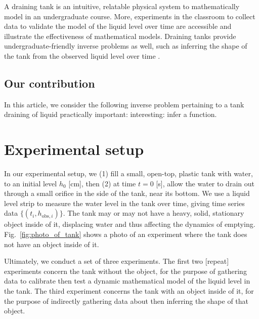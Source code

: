 \documentclass[openacc]{rsproca_new}%
\begin{document}

A draining tank is an intuitive, relatable physical system to mathematically model in an undergraduate course. 
More, experiments in the classroom to collect data to validate the model of the liquid level over time are accessible and illustrate the effectiveness of mathematical models.
\cite{farmer1992physical,driver1998torricelli,brady2009siphons,rother2024modelling,paldy1963apparatus,ivanov2014testing,williams2021vessel,pavesi2019investigating,planinvsivc2011holes,saleta2005experimental,lopac2015water,powell2012carrying}
Draining tanks provide undergraduate-friendly inverse problems \cite{groetsch1993inverse,neto2012introduction,tarantola2005inverse} as well, such as inferring the shape of the tank from the observed liquid level over time \cite{groetsch1993inverse,groetsch1999inverse}. 

\subsection{Our contribution}
In this article, we consider the following inverse problem pertaining to a tank draining of liquid
practically important:
interesting: infer a function. 


\section{Experimental setup} \label{sec:expt}
In our experimental setup, we (1) fill a small, open-top, plastic tank with water, to an initial level $h_0$ [cm], then (2) at time $t=0$ [s], allow the water to drain out through a small orifice in the side of the tank, near its bottom. 
We use a liquid level strip to measure the water level in the tank over time, giving time series data $\{(t_i, h_{\text{obs}, i}) \}$. The tank may or may not have a heavy, solid, stationary object inside of it, displacing water and thus affecting the dynamics of emptying. Fig.~\ref{fig:photo_of_tank} shows a photo of an experiment where the tank does not have an object inside of it.

Ultimately, we conduct a set of three experiments. The first two [repeat] experiments concern the tank without the object, for the purpose of gathering data to calibrate then test a dynamic mathematical model of the liquid level in the tank. The third experiment concerns the tank with an object inside of it, for the purpose of indirectly gathering data about then inferring the shape of that object.
\end{document}
